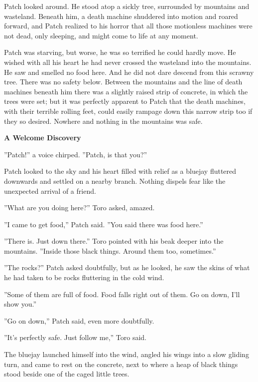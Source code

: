 \documentclass[11pt]{article}
\begin{document}
{ Patch looked around. He stood atop a sickly tree, surrounded by mountains and wasteland. Beneath him, a death machine shuddered into motion and roared forward, and Patch realized to his horror that all those motionless machines were not dead, only sleeping, and might come to life at any moment.\par
}Patch was starving, but worse, he was so terrified he could hardly move. He wished with all his heart he had never crossed the wasteland into the mountains. He saw and smelled no food here. And he did not dare descend from this scrawny tree. There was no safety below. Between the mountains and the line of death machines beneath him there was a slightly raised strip of concrete, in which the trees were set; but it was perfectly apparent to Patch that the death machines, with their terrible rolling feet, could easily rampage down this narrow strip too if they so desired. Nowhere and nothing in the mountains was safe.\par
\par
{\bf A Welcome Discovery\par
}\par
 ''Patch!'' a voice chirped. ''Patch, is that you?''\par
 Patch looked to the sky and his heart filled with relief as a bluejay fluttered downwards and settled on a nearby branch. Nothing dispels fear like the unexpected arrival of a friend.\par
 ''What are you doing here?'' Toro asked, amazed.\par
 ''I came to get food,'' Patch said. ''You said there was food here.''\par
 ''There is. Just down there.'' Toro pointed with his beak deeper into the mountains. ''Inside those black things. Around them too, sometimes.''\par
 ''The rocks?'' Patch asked doubtfully, but as he looked, he saw the skins of what he had taken to be rocks fluttering in the cold wind.\par
 ''Some of them are full of food. Food falls right out of them. Go on down, I'll show you.''\par
 ''Go on down,'' Patch said, even more doubtfully.\par
 ''It's perfectly safe. Just follow me,'' Toro said.\par
The bluejay launched himself into the wind, angled his wings into a slow gliding turn, and came to rest on the concrete, next to where a heap of black things stood beside one of the caged little trees.\par
\end{document}
